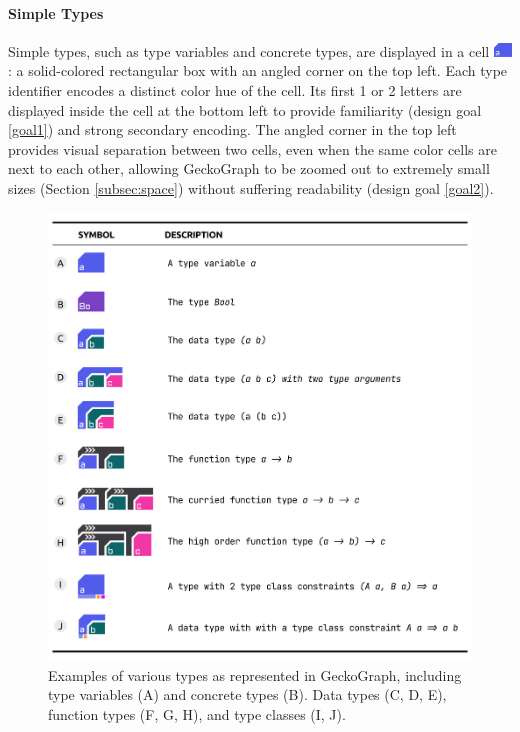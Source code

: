 \paragraph{Simple Types} 
Simple types, such as type variables and concrete types, are displayed in a cell \includegraphics[height=1em]{figures/SimpleType}: a solid-colored rectangular box with an angled corner on the top left. Each type identifier encodes a distinct color hue of the cell.  Its first 1 or 2 letters are displayed inside the cell at the bottom left to provide familiarity (design goal \ref{goal1}) and strong secondary encoding. The angled corner in the top left provides visual separation between two cells, even when the same color cells are next to each other, allowing GeckoGraph to be zoomed out to extremely small sizes (Section \ref{subsec:space}) without suffering readability (design goal \ref{goal2}).

\begin{figure}[hbt]
  \includegraphics[width=\linewidth]{figures/Design}
  \caption[Examples of various types as represented in GeckoGraph]{
        \label{fig:design}
        Examples of various types as represented in GeckoGraph, including type variables (A) and concrete types (B). Data types (C, D, E), function types (F, G, H), and type classes (I, J).
  }
\end{figure}


